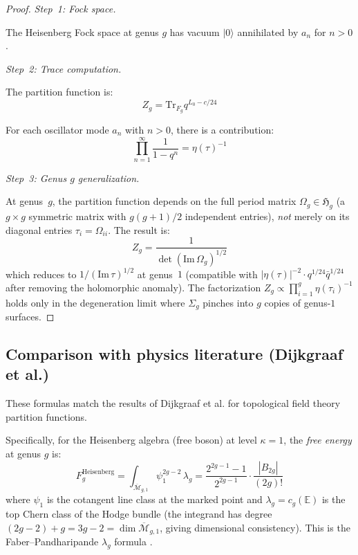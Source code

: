 \begin{proof}
\emph{Step~1: Fock space.}

The Heisenberg Fock space at genus $g$ has vacuum $|0\rangle$ annihilated by $a_n$
for $n > 0$.

\emph{Step~2: Trace computation.}

The partition function is:
\[Z_g = \text{Tr}_{F_g} q^{L_0 - c/24}\]

For each oscillator mode $a_n$ with $n > 0$, there is a contribution:
\[\prod_{n=1}^{\infty} \frac{1}{1 - q^n} = \eta(\tau)^{-1}\]

\emph{Step~3: Genus $g$ generalization.}

At genus~$g$, the partition function depends on the full period matrix
$\Omega_g \in \mathfrak{H}_g$ (a $g \times g$ symmetric matrix with
$g(g+1)/2$ independent entries), \emph{not} merely on its diagonal entries
$\tau_i = \Omega_{ii}$.  The result is:
\[Z_g = \frac{1}{\det(\mathrm{Im}\,\Omega_g)^{1/2}}\]
which reduces to $1/(\mathrm{Im}\,\tau)^{1/2}$ at genus~$1$ (compatible
with $|\eta(\tau)|^{-2} \cdot q^{1/24}\bar{q}^{1/24}$ after removing the
holomorphic anomaly).  The factorization
$Z_g \propto \prod_{i=1}^g \eta(\tau_i)^{-1}$ holds only in the
degeneration limit where $\Sigma_g$ pinches into $g$ copies of
genus-$1$ surfaces.
\end{proof}

\subsection{Comparison with physics literature (Dijkgraaf et al.)}
\label{subsec:physics-comparison}

\begin{theorem}\label{thm:dmvv-agreement}
These formulas match the results of Dijkgraaf et al. \cite{DMVV} for topological 
field theory partition functions.

Specifically, for the Heisenberg algebra (free boson) at level $\kappa = 1$, the \emph{free energy} at genus $g$ is:
\begin{equation}
F_g^{\text{Heisenberg}} = \int_{\overline{\mathcal{M}}_{g,1}} \psi_1^{2g-2}\,\lambda_g
= \frac{2^{2g-1}-1}{2^{2g-1}} \cdot \frac{|B_{2g}|}{(2g)!}
\end{equation}
where $\psi_1$ is the cotangent line class at the marked point and $\lambda_g = c_g(\mathbb{E})$ is the top Chern class of the Hodge bundle (the integrand has degree $(2g-2)+g = 3g-2 = \dim\overline{\mathcal{M}}_{g,1}$, giving dimensional consistency).  This is the Faber--Pandharipande $\lambda_g$ formula \cite{FP00}.
\end{theorem}

